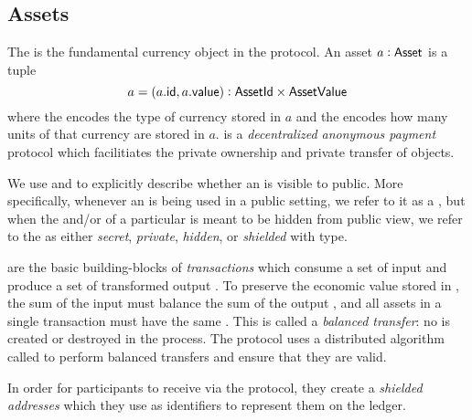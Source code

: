 \subsection{Assets}

The \Asset{} is the fundamental currency object in the \MantaPay{} protocol. An asset $a : {\textsf{Asset}}$ is a tuple
\[a = (a.{\textsf{id}}, a.{\textsf{value}}) : {\textsf{AssetId}} \times {\textsf{AssetValue}}\]
where the \AssetId{} encodes the type of currency stored in $a$ and the \AssetValue{} encodes how many units of that currency are stored in $a$.  \MantaPay{} is a \emph{decentralized anonymous payment} protocol which facilitiates the private ownership and private transfer of \Asset{} objects. 


We use \PublicAsset{} and \SecretAsset{} to explicitly describe whether an \Asset{} is visible to public.
More specifically, whenever an \Asset{} is being used in a public setting, we refer to it as a \PublicAsset{}, 
but when the \AssetId{} and/or \AssetValue{} of a particular \Asset{} is meant to be hidden from public view, we refer to the \Asset{} as either \emph{secret}, \emph{private}, \emph{hidden}, or \emph{shielded} with \SecretAsset{} type.

 are the basic building-blocks of \emph{transactions} which consume a set of input  and produce a set of transformed output . To preserve the economic value stored in , the sum of the input  must balance the sum of the output , and all assets in a single transaction must have the same \AssetId{}\footnotemark{}. This is called a \emph{balanced transfer}: no \AssetValue{} is created or destroyed in the process. The \MantaPay{} protocol uses a distributed algorithm called \Transfer{} to perform balanced transfers and ensure that they are valid.


In order for \MantaPay{} participants to receive  via the \Transfer{} protocol, they create a \emph{shielded addresses} which they use as identifiers to represent them on the ledger.

